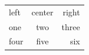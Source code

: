 \documentclass{article}
\begin{document}
\begin{tabular}{|l:c:r|}
\hline
left & center & right \\
\hdashline
one & two & three \\
\hdashline
four & five & six \\
\hline
\end{tabular}
\end{document}
